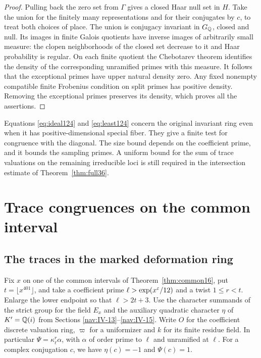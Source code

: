 \documentclass[a4paper,11pt]{article}
\theoremstyle{definition}
\theoremstyle{remark}
\numberwithin{equation}{section}
\begin{document}
\begin{proof}
Pulling back the zero set from \(\Gamma\) gives a closed Haar
null set in \(H\). Take the union for the finitely many
representations and for their conjugates by \(c\), to treat
both choices of place. The union is conjugacy invariant in
\(G_\mathbb Q\), closed and null. Its images in finite Galois
quotients have inverse images of arbitrarily small measure:
the clopen neighborhoods of the closed set decrease to it
and Haar probability is regular. On each finite quotient the
Chebotarev theorem identifies the density of the corresponding
unramified primes with this measure. It follows that the
exceptional primes have upper natural density zero. Any fixed
nonempty compatible finite Frobenius condition on split primes
has positive density. Removing the exceptional primes preserves
its density, which proves all the assertions.
\end{proof}

Equations \eqref{eq:ideal124} and \eqref{eq:least124} concern the original invariant
ring even when it has positive-dimensional special fiber.
They give a finite test for congruence with the diagonal.
The size bound depends on the coefficient prime, and it bounds
the sampling primes. A uniform bound for the sum of trace
valuations on the
remaining irreducible loci is still required in the intersection
estimate of Theorem~\ref{thm:full36}.

\section{Trace congruences on the common interval}\label{nav:g-IV-4}

\subsection{The traces in the marked deformation ring}\label{nav:IV-25}
Fix \(x\) on one of the common intervals of
Theorem~\ref{thm:common16}, put \(t=\lfloor x^{401}\rfloor\), and
take a coefficient prime \(\ell>\exp(x^\varepsilon/12)\) and a twist
\(1\le r<t\). Enlarge the lower endpoint so that \(\ell>2t+3\).
Use the character summands of the strict group for the field
\(E_x\) and the auxiliary quadratic character \(\eta\) of
\(K'=\mathbb Q(i)\) from
Sections \ref{nav:IV-13}--\ref{nav:IV-15}.
Write \(O\) for the coefficient discrete valuation ring,
\(\varpi\) for a uniformizer and \(k\) for its finite residue field.
In particular \(\Psi=\kappa_\ell^r\alpha\), with \(\alpha\)
of order prime to \(\ell\) and unramified at \(\ell\).
For a complex conjugation \(c\), we have \(\eta(c)=-1\) and
\(\Psi(c)=1\).
\end{document}
